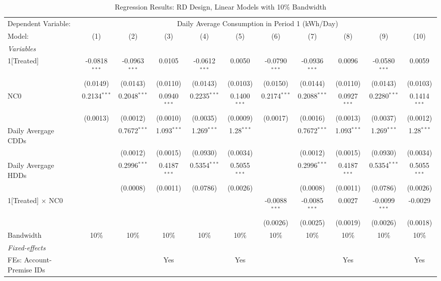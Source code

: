 \begin{table}[htbp]
\centering
\caption{\label{Table:Regression-Results_RD_Linear_BW-10} Regression Results: RD Design, Linear Models with 10\% Bandwidth}
\begin{tabular}{lcccccccccc}
\tabularnewline\toprule\toprule
Dependent Variable:&\multicolumn{10}{c}{Daily Average Consumption in Period 1 (kWh/Day)}\\
Model:&(1) & (2) & (3) & (4) & (5) & (6) & (7) & (8) & (9) & (10)\\
\midrule
\emph{Variables}&   &   &   &   &   &   &   &   &   &  \\
1[Treated]&-0.0818$^{***}$ & -0.0963$^{***}$ & 0.0105 & -0.0612$^{***}$ & 0.0050 & -0.0790$^{***}$ & -0.0936$^{***}$ & 0.0096 & -0.0580$^{***}$ & 0.0059\\
  &(0.0149) & (0.0143) & (0.0110) & (0.0143) & (0.0103) & (0.0150) & (0.0144) & (0.0110) & (0.0143) & (0.0103)\\
NC0&0.2134$^{***}$ & 0.2048$^{***}$ & 0.0940$^{***}$ & 0.2235$^{***}$ & 0.1400$^{***}$ & 0.2174$^{***}$ & 0.2088$^{***}$ & 0.0927$^{***}$ & 0.2280$^{***}$ & 0.1414$^{***}$\\
  &(0.0013) & (0.0012) & (0.0010) & (0.0035) & (0.0009) & (0.0017) & (0.0016) & (0.0013) & (0.0037) & (0.0012)\\
Daily Avergage CDDs&   & 0.7672$^{***}$ & 1.093$^{***}$ & 1.269$^{***}$ & 1.28$^{***}$ &    & 0.7672$^{***}$ & 1.093$^{***}$ & 1.269$^{***}$ & 1.28$^{***}$\\
  &   & (0.0012) & (0.0015) & (0.0930) & (0.0034) &    & (0.0012) & (0.0015) & (0.0930) & (0.0034)\\
Daily Avergage HDDs&   & 0.2996$^{***}$ & 0.4187$^{***}$ & 0.5354$^{***}$ & 0.5055$^{***}$ &    & 0.2996$^{***}$ & 0.4187$^{***}$ & 0.5354$^{***}$ & 0.5055$^{***}$\\
  &   & (0.0008) & (0.0011) & (0.0786) & (0.0026) &    & (0.0008) & (0.0011) & (0.0786) & (0.0026)\\
1[Treated] $\times $ NC0&   &    &    &    &    & -0.0088$^{***}$ & -0.0085$^{***}$ & 0.0027 & -0.0099$^{***}$ & -0.0029\\
  &   &    &    &    &    & (0.0026) & (0.0025) & (0.0019) & (0.0026) & (0.0018)\\
\midrule Bandwidth & 10\% & 10\% & 10\% & 10\% & 10\% & 10\% & 10\% & 10\% & 10\% & 10\%\\
\midrule
\emph{Fixed-effects}&   &   &   &   &   &   &   &   &   &  \\
FEs: Account-Premise IDs &  &  & Yes &  & Yes &  &  & Yes &  & Yes\\

\end{tabular}
\end{table}
